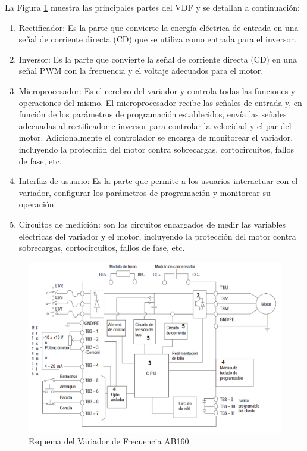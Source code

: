 La Figura \ref{fig:ab160} muestra las principales partes del VDF y se detallan a continuación:
\begin{enumerate}
	\item Rectificador: Es la parte que convierte la energía eléctrica de entrada en una señal de corriente directa (CD) que se utiliza como entrada para el inversor.
	
	\item Inversor: Es la parte que convierte la señal de corriente directa (CD) en una señal PWM con la frecuencia y el voltaje adecuados para el motor.
	
	\item Microprocesador: Es el cerebro del variador y controla todas las funciones y operaciones del mismo. El microprocesador recibe las señales de entrada y, en función de los parámetros de programación establecidos, envía las señales adecuadas al rectificador e inversor para controlar la velocidad y el par del motor.
	Adicionalmente el controlador se encarga de monitorear el variador, incluyendo la protección del motor contra sobrecargas, cortocircuitos, fallos de fase, etc.
	
	\item Interfaz de usuario: Es la parte que permite a los usuarios interactuar con el variador, configurar los parámetros de programación y monitorear su operación.
	
	\item Circuitos de medición: son los circuitos encargados de medir las variables eléctricas del variador y el motor, incluyendo la protección del motor contra sobrecargas, cortocircuitos, fallos de fase, etc.
	
\end{enumerate}

\begin{figure}
	\centering
	\includegraphics[width=0.9\linewidth]{fig/AB160}
	\caption{Esquema del Variador de Frecuencia AB160.\cite{AB160} }
	\label{fig:ab160}
\end{figure}

